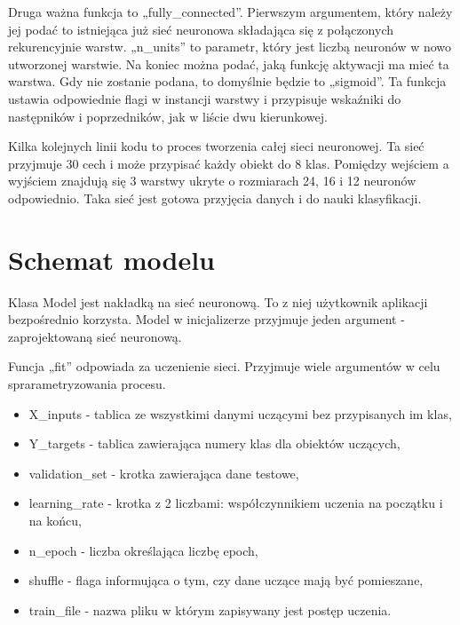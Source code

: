     Druga ważna funkcja to „fully\_connected”.
    Pierwszym argumentem, który należy jej podać to istniejąca już sieć neuronowa składająca się z połączonych rekurencyjnie warstw.
    „n\_units” to parametr, który jest liczbą neuronów w nowo utworzonej warstwie.
    Na koniec można podać, jaką funkcję aktywacji ma mieć ta warstwa.
    Gdy nie zostanie podana, to domyślnie będzie to „sigmoid”.
    Ta funkcja ustawia odpowiednie flagi w instancji warstwy i przypisuje wskaźniki do następników i poprzedników, jak w liście dwu kierunkowej.

    Kilka kolejnych linii kodu to proces tworzenia całej sieci neuronowej.
    Ta sieć przyjmuje 30 cech i może przypisać każdy obiekt do 8 klas.
    Pomiędzy wejściem a wyjściem znajdują się 3 warstwy ukryte o rozmiarach 24, 16 i 12 neuronów odpowiednio.
    Taka sieć jest gotowa przyjęcia danych i do nauki klasyfikacji.

    \section{Schemat modelu}\label{sec:schematModelu}


    Klasa Model jest nakładką na sieć neuronową.
    To z niej użytkownik aplikacji bezpośrednio korzysta.
    Model w inicjalizerze przyjmuje jeden argument - zaprojektowaną sieć neuronową.

    Funcja „fit” odpowiada za uczenienie sieci.
    Przyjmuje wiele argumentów w celu sprarametryzowania procesu.
    \begin{itemize}
        \item X\_inputs - tablica ze wszystkimi danymi uczącymi bez przypisanych im klas,
        \item Y\_targets - tablica zawierająca numery klas dla obiektów uczących,
        \item validation\_set - krotka zawierająca dane testowe,
        \item learning\_rate - krotka z 2 liczbami: współczynnikiem uczenia na początku i na końcu,
        \item n\_epoch - liczba określająca liczbę epoch,
        \item shuffle - flaga informująca o tym, czy dane uczące mają być pomieszane,
        \item train\_file - nazwa pliku w którym zapisywany jest postęp uczenia.
    \end{itemize}

